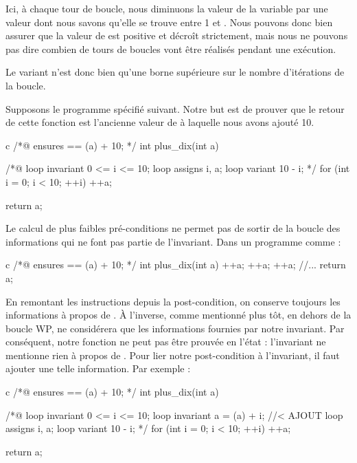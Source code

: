 Ici, à chaque tour de boucle, nous diminuons la valeur de la variable  par une
valeur dont nous savons qu'elle se trouve entre 1 et . Nous pouvons donc bien 
assurer que la valeur de  est positive et décroît strictement, mais nous ne 
pouvons pas dire combien de tours de boucles vont être réalisés pendant une 
exécution.



Le variant n'est donc bien qu'une borne supérieure sur le nombre d'itérations 
de la boucle.





Supposons le programme spécifié suivant. Notre but est de prouver que le retour
de cette fonction est l'ancienne valeur de  à laquelle nous avons ajouté 10.



\begin{CodeBlock}{c}
/*@
    ensures \result == \old(a) + 10;
*/
int plus_dix(int a){
    /*@
        loop invariant 0 <= i <= 10;
        loop assigns i, a;
        loop variant 10 - i;
    */
    for (int i = 0; i < 10; ++i)
        ++a;

    return a;
}
\end{CodeBlock}



Le calcul de plus faibles pré-conditions ne permet pas de sortir de la boucle des
informations qui ne font pas partie de l'invariant. Dans un programme comme :



\begin{CodeBlock}{c}
/*@
    ensures \result == \old(a) + 10;
*/
int plus_dix(int a){
    ++a;
    ++a;
    ++a;
    //...
    return a;
}
\end{CodeBlock}



En remontant les instructions depuis la post-condition, on conserve toujours les
informations à propos de . À l'inverse, comme mentionné plus tôt, en dehors
de la boucle WP, ne considérera que les informations fournies par notre
invariant. Par conséquent, notre fonction  ne peut pas être prouvée
en l'état : l'invariant ne mentionne rien à propos de . Pour lier notre
post-condition à l'invariant, il faut ajouter une telle information. Par 
exemple :



\begin{CodeBlock}{c}
/*@
    ensures \result == \old(a) + 10;
*/
int plus_dix(int a){
    /*@
        loop invariant 0 <= i <= 10;
        loop invariant a = \old(a) + i; //< AJOUT
        loop assigns i, a;
        loop variant 10 - i;
    */
    for (int i = 0; i < 10; ++i)
        ++a;

    return a;
}
\end{CodeBlock}



